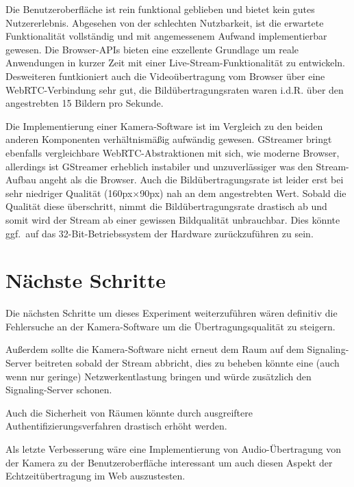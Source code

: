 \documentclass{article}
\begin{document}
\begin{onecolumn}
Die Benutzeroberfläche ist rein funktional geblieben und bietet kein gutes
Nutzererlebnis. Abgesehen von der schlechten Nutzbarkeit, ist die erwartete
Funktionalität vollständig und mit angemessenem Aufwand implementierbar
gewesen. Die Browser-APIs bieten eine exzellente Grundlage um reale
Anwendungen in kurzer Zeit mit einer Live-Stream-Funktionalität zu entwickeln.
Desweiteren funtkioniert auch die Videoübertragung vom Browser über eine
WebRTC-Verbindung sehr gut, die Bildübertragungsraten waren i.d.R. über den
angestrebten 15 Bildern pro Sekunde.

Die Implementierung einer Kamera-Software ist im Vergleich zu den beiden
anderen Komponenten verhältnismäßig aufwändig gewesen. GStreamer bringt
ebenfalls vergleichbare WebRTC-Abstraktionen mit sich, wie moderne Browser,
allerdings ist GStreamer erheblich instabiler und unzuverlässiger was den
Stream-Aufbau angeht als die Browser. Auch die Bildübertragungsrate ist leider
erst bei sehr niedriger Qualität (160px$\times$90px) nah an dem angestrebten
Wert. Sobald die Qualität diese überschritt, nimmt die Bildübertragungsrate
drastisch ab und somit wird der Stream ab einer gewissen Bildqualität
unbrauchbar. Dies könnte ggf.\ auf das 32-Bit-Betriebssystem der Hardware
zurückzuführen zu sein.


\section{Nächste Schritte}

Die nächsten Schritte um dieses Experiment weiterzuführen wären definitiv die
Fehlersuche an der Kamera-Software um die Übertragungsqualität zu steigern.

Außerdem sollte die Kamera-Software nicht erneut dem Raum auf dem
Signaling-Server beitreten sobald der Stream abbricht, dies zu beheben könnte
eine (auch wenn nur geringe) Netzwerkentlastung bringen und würde zusätzlich
den Signaling-Server schonen.

Auch die Sicherheit von Räumen könnte durch ausgreiftere
Authentifizierungsverfahren drastisch erhöht werden.

Als letzte Verbesserung wäre eine Implementierung von Audio-Übertragung von der
Kamera zu der Benutzeroberfläche interessant um auch diesen Aspekt der
Echtzeitübertragung im Web auszustesten.


\nocite{*}




\end{onecolumn}
\end{document}
